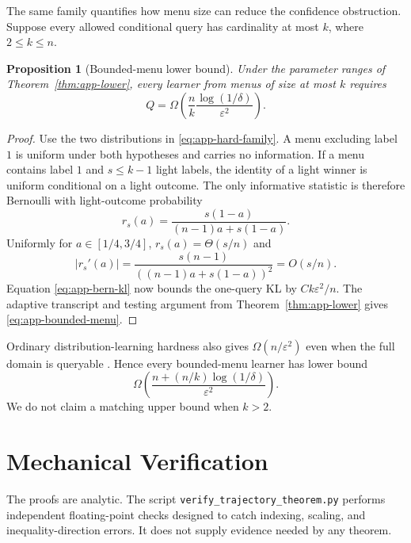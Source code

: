 \documentclass{article}
\newtheorem{proposition}[theorem]{Proposition}
\begin{document}
The same family quantifies how menu size can reduce the confidence
obstruction. Suppose every allowed conditional query has cardinality at most
$k$, where $2\le k\le n$.

\begin{proposition}[Bounded-menu lower bound]
\label{prop:app-bounded-menu}
Under the parameter ranges of Theorem~\ref{thm:app-lower}, every learner from
menus of size at most $k$ requires
\begin{equation}
 Q=\Omega\!\left(
 \frac{n}{k}\frac{\log(1/\delta)}{\varepsilon^2}
 \right).
 \label{eq:app-bounded-menu}
\end{equation}
\end{proposition}

\begin{proof}
Use the two distributions in \eqref{eq:app-hard-family}. A menu excluding
label $1$ is uniform under both hypotheses and carries no information. If a
menu contains label $1$ and $s\le k-1$ light labels, the identity of a light
winner is uniform conditional on a light outcome. The only informative
statistic is therefore Bernoulli with light-outcome probability
\begin{equation}
 r_s(a)=\frac{s(1-a)}{(n-1)a+s(1-a)}.
 \label{eq:app-rs}
\end{equation}
Uniformly for $a\in[1/4,3/4]$,
$r_s(a)=\Theta(s/n)$ and
\begin{equation}
 |r_s'(a)|
 =\frac{s(n-1)}{((n-1)a+s(1-a))^2}
 =O(s/n).
 \label{eq:app-rs-derivative}
\end{equation}
Equation \eqref{eq:app-bern-kl} now bounds the one-query KL by
$Ck\varepsilon^2/n$. The adaptive transcript and testing argument from
Theorem~\ref{thm:app-lower} gives \eqref{eq:app-bounded-menu}.
\end{proof}

Ordinary distribution-learning hardness also gives
$\Omega(n/\varepsilon^2)$ even when the full domain is queryable
\citep{canonne2020short}. Hence every bounded-menu learner has lower bound
\[
 \Omega\!\left(\frac{n+(n/k)\log(1/\delta)}{\varepsilon^2}\right).
\]
We do not claim a matching upper bound when $k>2$.

\section{Mechanical Verification}
\label{app:verification}

The proofs are analytic. The script
\texttt{verify\_trajectory\_theorem.py} performs independent floating-point
checks designed to catch indexing, scaling, and inequality-direction errors.
It does not supply evidence needed by any theorem.
\end{document}
